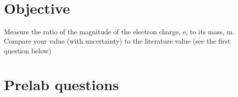 \documentclass{tufte-handout}
\begin{document}



\vspace{0.5cm}
\\
\vspace{0.5cm}

\section{Objective}
Measure the ratio of the magnitude of the electron charge, e, to its mass, m.
Compare your value (with uncertainty) to the literature value (see the first question below)


\section{Prelab questions}
\end{document}

